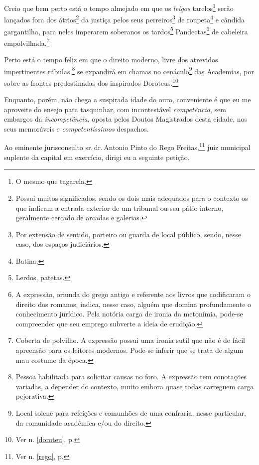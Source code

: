 Creio que bem perto está o tempo almejado em que os \emph{leigos}
tarelos\footnote{O mesmo que tagarela.} serão lançados fora dos
átrios\footnote{Possui muitos significados, sendo os dois mais
  adequados para o contexto os que indicam a entrada exterior de um
  tribunal ou seu pátio interno, geralmente cercado de arcadas e
  galerias.} da justiça pelos seus perreiros\footnote{Por extensão de
  sentido, porteiro ou guarda de local público, sendo, nesse caso, dos
  espaços judiciários.} de roupeta\footnote{Batina.} e cândida
gargantilha, para neles imperarem soberanos os tardos\footnote{Lerdos,
  patetas.} Pandectas\footnote{A expressão, oriunda do grego antigo e
  referente aos livros que codificaram o direito dos romanos, indica,
  nesse caso, alguém que domina profundamente o conhecimento jurídico.
  Pela notória carga de ironia da metonímia, pode-se compreender que seu
  emprego subverte a ideia de erudição.} de cabeleira
empolvilhada.\footnote{Coberta de polvilho. A expressão possui uma
  ironia sutil que não é de fácil apreensão para os leitores modernos.
  Pode-se inferir que se trata de algum mau costume da época.}

Perto está o tempo feliz em que o direito moderno, livre dos atrevidos
impertinentes rábulas,\footnote{Pessoa habilitada para solicitar causas
  no foro. A expressão tem conotações variadas, a depender do contexto,
  muito embora quase todas carreguem carga pejorativa.} se expandirá em
chamas no cenáculo\footnote{Local solene para refeições e comunhões de
  uma confraria, nesse particular, da comunidade acadêmica e/ou do
  direito.} das Academias, por sobre as frontes predestinadas dos
inspirados Doroteus.\footnote{Ver n. \ref{doroteu}, p. \pageref{doroteu}}

Enquanto, porém, não chega a suspirada idade do ouro, conveniente é que
eu me aproveite do ensejo para tasquinhar, com incontestável
\emph{competência}, sem embargos da \emph{incompetência}, oposta pelos
Doutos Magistrados desta cidade, nos seus memoráveis e
\emph{competentíssimos} despachos.

Ao eminente jurisconsulto sr.\,dr.\,Antonio Pinto do Rego
Freitas,\footnote{Ver n. \ref{rego}, p. \pageref{rego}}
juiz municipal suplente da capital em exercício, dirigi 
eu a seguinte petição.

